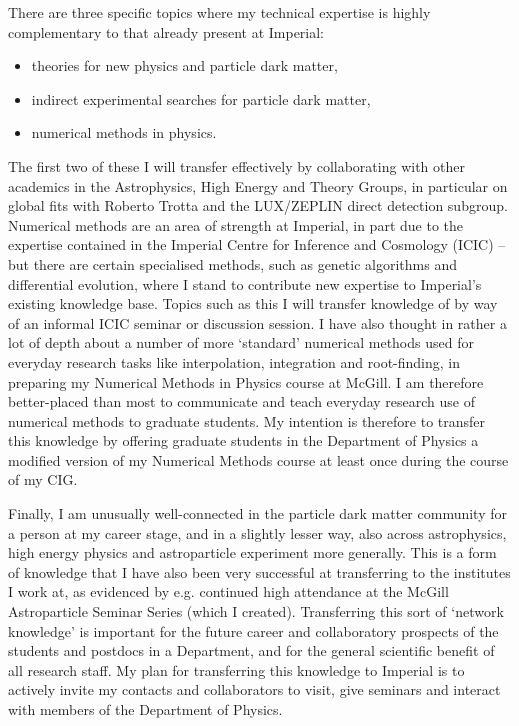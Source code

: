 \documentclass[a4paper,11pt]{article}
\begin{document}
There are three specific topics where my technical expertise is highly complementary to that already present at Imperial:
\begin{itemize}
\item theories for new physics and particle dark matter,
\item indirect experimental searches for particle dark matter,
\item numerical methods in physics.
\end{itemize}
The first two of these I will transfer effectively by collaborating with other academics in the Astrophysics, High Energy and Theory Groups, in particular on global fits with Roberto Trotta and the LUX/ZEPLIN direct detection subgroup.  Numerical methods are an area of strength at Imperial, in part due to the expertise contained in the Imperial Centre for Inference and Cosmology (ICIC) -- but there are certain specialised methods, such as genetic algorithms and differential evolution, where I stand to contribute new expertise to Imperial's existing knowledge base.  Topics such as this I will transfer knowledge of by way of an informal ICIC seminar or discussion session.  I have also thought in rather a lot of depth about a number of more `standard' numerical methods used for everyday research tasks like interpolation, integration and root-finding, in preparing my Numerical Methods in Physics course at McGill.  I am therefore better-placed than most to communicate and teach everyday research use of numerical methods to graduate students.  My intention is therefore to transfer this knowledge by offering graduate students in the Department of Physics a modified version of my Numerical Methods course at least once during the course of my CIG.

Finally, I am unusually well-connected in the particle dark matter community for a person at my career stage, and in a slightly lesser way, also across astrophysics, high energy physics and astroparticle experiment more generally.  This is a form of knowledge that I have also been very successful at transferring to the institutes I work at, as evidenced by e.g. continued high attendance at the McGill Astroparticle Seminar Series (which I created).  Transferring this sort of `network knowledge' is important for the future career and collaboratory prospects of the students and postdocs in a Department, and for the general scientific benefit of all research staff.  My plan for transferring this knowledge to Imperial is to actively invite my contacts and collaborators to visit, give seminars and interact with members of the Department of Physics.
\end{document}
